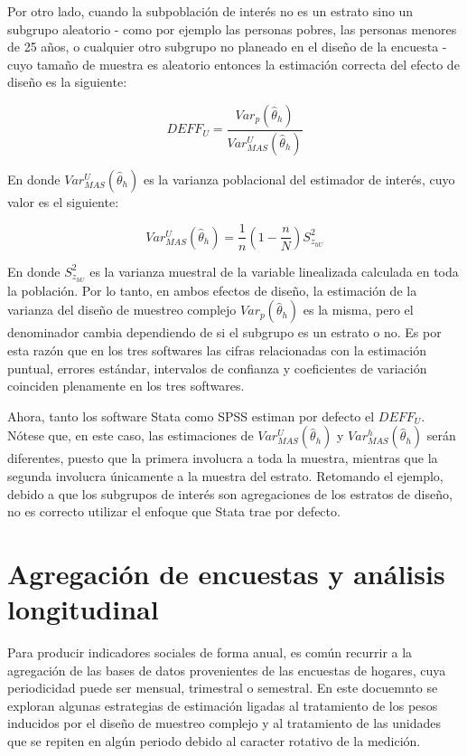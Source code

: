 \documentclass[12pt,spanish,]{book}
\begin{document}
Por otro lado, cuando la subpoblación de interés no es un estrato sino un subgrupo aleatorio - como por ejemplo las personas pobres, las personas menores de 25 años, o cualquier otro subgrupo no planeado en el diseño de la encuesta - cuyo tamaño de muestra es aleatorio entonces la estimación correcta del efecto de diseño es la siguiente:

\[
DEFF_U= \frac{Var_p (\hat\theta_h) }{Var_{MAS}^U(\hat\theta_h) }
\]

En donde \(Var_{MAS}^U(\hat\theta_h)\) es la varianza poblacional del estimador de interés, cuyo valor es el siguiente:

\[
Var_{MAS}^U(\hat\theta_h)=\frac{1}{n}\left(1-\frac{n}{N}\right)S_{z_{hU}}^2
\]

En donde \(S_{z_{hU}}^2\) es la varianza muestral de la variable linealizada calculada en toda la población. Por lo tanto, en ambos efectos de diseño, la estimación de la varianza del diseño de muestreo complejo \(Var_p (\hat\theta_h)\) es la misma, pero el denominador cambia dependiendo de si el subgrupo es un estrato o no. Es por esta razón que en los tres softwares las cifras relacionadas con la estimación puntual, errores estándar, intervalos de confianza y coeficientes de variación coinciden plenamente en los tres softwares.

Ahora, tanto los software Stata como SPSS estiman por defecto el \(DEFF_U\). Nótese que, en este caso, las estimaciones de \(Var_{MAS}^U(\hat\theta_h)\) y \(Var_{MAS}^h(\hat\theta_h)\) serán diferentes, puesto que la primera involucra a toda la muestra, mientras que la segunda involucra únicamente a la muestra del estrato. Retomando el ejemplo, debido a que los subgrupos de interés son agregaciones de los estratos de diseño, no es correcto utilizar el enfoque que Stata trae por defecto.

\hypertarget{agregacion-de-encuestas-y-analisis-longitudinal}{%
\chapter{Agregación de encuestas y análisis longitudinal}\label{agregacion-de-encuestas-y-analisis-longitudinal}}

Para producir indicadores sociales de forma anual, es común recurrir a la agregación de las bases de datos provenientes de las encuestas de hogares, cuya periodicidad puede ser mensual, trimestral o semestral. En este docuemnto se exploran algunas estrategias de estimación ligadas al tratamiento de los pesos inducidos por el diseño de muestreo complejo y al tratamiento de las unidades que se repiten en algún periodo debido al caracter rotativo de la medición.
\end{document}
